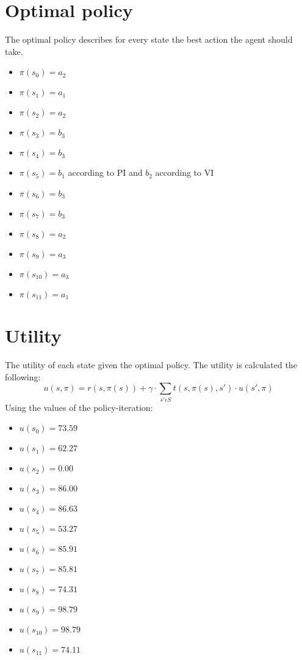 \documentclass[a4paper]{article}
\begin{document}
\section{Optimal policy}
The optimal policy describes for every state the best action the agent should take.

\begin{multicols}{2}
\begin{itemize}
\item $\pi(s_{0}) = a_{2}$
\item $\pi(s_{1}) = a_{1}$
\item $\pi(s_{2}) = a_{2}$
\item $\pi(s_{3}) = b_{3}$
\item $\pi(s_{4}) = b_{3}$
\item $\pi(s_{5}) = b_{1}$ according to PI and $b_{2}$ according to VI
\item $\pi(s_{6}) = b_{3}$
\item $\pi(s_{7}) = b_{3}$
\item $\pi(s_{8}) = a_{2}$
\item $\pi(s_{9}) = a_{3}$
\item $\pi(s_{10}) = a_{3}$
\item $\pi(s_{11}) = a_{1}$
\end{itemize}
\end{multicols}

\section{Utility}
The utility of each state given the optimal policy. The utility is calculated the following:
\begin{equation}
u(s,\pi) = r(s,\pi(s)) + \gamma \cdot \sum_{s' \epsilon S} t(s,\pi(s),s') \cdot u(s',\pi)
\end{equation}
Using the values of the policy-iteration:
\begin{multicols}{2}
\begin{itemize}
\item $u(s_0) = 73.59 $
\item $u(s_1) = 62.27 $
\item $u(s_2) = 0.00 $
\item $u(s_3) = 86.00 $
\item $u(s_4) = 86.63 $
\item $u(s_5) = 53.27 $
\item $u(s_6) = 85.91 $
\item $u(s_7) = 85.81 $
\item $u(s_8) = 74.31 $
\item $u(s_9) = 98.79 $
\item $u(s_{10}) = 98.79 $
\item $u(s_{11}) = 74.11 $
\end{itemize}
\end{multicols}
\end{document}
